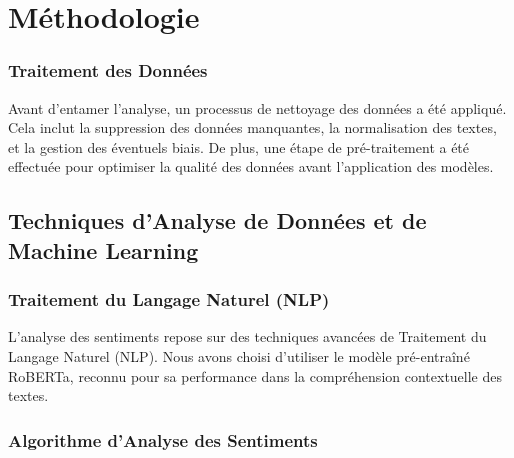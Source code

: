 


\section{Méthodologie}











\newpage




























\subsubsection{Traitement des Données}

Avant d'entamer l'analyse, un processus de nettoyage des données a été appliqué. Cela inclut la suppression des données manquantes, la normalisation des textes, et la gestion des éventuels biais. De plus, une étape de pré-traitement a été effectuée pour optimiser la qualité des données avant l'application des modèles.

\subsection{Techniques d'Analyse de Données et de Machine Learning}

\subsubsection{Traitement du Langage Naturel (NLP)}

L'analyse des sentiments repose sur des techniques avancées de Traitement du Langage Naturel (NLP). Nous avons choisi d'utiliser le modèle pré-entraîné RoBERTa, reconnu pour sa performance dans la compréhension contextuelle des textes.

\subsubsection{Algorithme d'Analyse des Sentiments}

